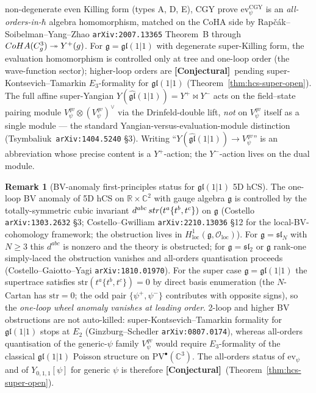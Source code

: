 \documentclass[11pt]{amsart}
\theoremstyle{definition}
\newtheorem{remark}[theorem]{Remark}
\providecommand{\CoHA}{\mathrm{CoHA}}
\providecommand{\cO}{\mathcal{O}}
\providecommand{\R}{\mathbb{R}}
\providecommand{\C}{\mathbb{C}}
\providecommand{\fgl}{\mathfrak{gl}}
\providecommand{\fsl}{\mathfrak{sl}}
\providecommand{\fg}{\mathfrak{g}}
\providecommand{\ClaimStatusConjectured}{\textbf{\textsf{[Conjectural]}}}
\begin{document}
non-degenerate even Killing form (types A, D, E), CGY prove
$\mathrm{ev}^{\mathrm{CGY}}_\psi$ is an \emph{all-orders-in-$\hbar$}
algebra homomorphism, matched on the CoHA side by
Rap\v{c}\'ak--Soibelman--Yang--Zhao \texttt{arXiv:2007.13365} Theorem~B
through $\CoHA(\C^3_\fg) \twoheadrightarrow Y^+(\widehat\fg)$. For
$\fg = \fgl(1|1)$ with degenerate super-Killing form, the evaluation
homomorphism is controlled only at tree and one-loop order (the
wave-function sector); higher-loop orders are \ClaimStatusConjectured\
pending super-Kontsevich--Tamarkin $E_3$-formality for $\fgl(1|1)$
(Theorem~\ref{thm:hcs-super-open}). The full affine super-Yangian
$Y(\widehat{\fgl}(1|1)) = Y^+ \bowtie Y^-$ acts on the field--state
pairing module $V^{qv}_\psi \otimes (V^{qv}_\psi)^\vee$ via the
Drinfeld-double lift, \emph{not} on $V^{qv}_\psi$ itself as a single
module --- the standard Yangian-versus-evaluation-module distinction
(Tsymbaliuk~\texttt{arXiv:1404.5240} §3). Writing
``$Y(\widehat{\fgl}(1|1)) \to V^{qv}_\psi$'' is an abbreviation whose
precise content is a $Y^+$-action; the $Y^-$-action lives on the dual
module.

\begin{remark}[BV-anomaly first-principles status for $\fgl(1|1)$ 5D hCS]
\label{rem:bv-anomaly-super-firstprinciples}
The one-loop BV anomaly of 5D hCS on $\R\times\C^2$ with gauge algebra
$\fg$ is controlled by the totally-symmetric cubic invariant
$d^{abc}\,{\rm str}(t^a\{t^b,t^c\})$ on $\fg$ (Costello
\texttt{arXiv:1303.2632} \S3; Costello--Gwilliam \texttt{arXiv:2210.13036}
\S12 for the local-BV-cohomology framework; the obstruction lives in
$H^1_{\mathrm{loc}}(\fg, \cO_{\mathrm{loc}})$). For $\fg = \fsl_N$ with
$N\geq 3$ this $d^{abc}$ is nonzero and the theory is obstructed; for
$\fg = \fsl_2$ or $\fg$ rank-one simply-laced the obstruction vanishes
and all-orders quantisation proceeds (Costello--Gaiotto--Yagi
\texttt{arXiv:1810.01970}). For the super case $\fg = \fgl(1|1)$ the
supertrace satisfies $\mathrm{str}(t^a\{t^b,t^c\}) = 0$ by direct basis
enumeration (the $N$-Cartan has $\mathrm{str} = 0$; the odd pair
$\{\psi^+,\psi^-\}$ contributes with opposite signs), so the
\emph{one-loop wheel anomaly vanishes at leading order}. 2-loop and
higher BV obstructions are not auto-killed: super-Kontsevich--Tamarkin
formality for $\fgl(1|1)$ stops at $E_2$ (Ginzburg--Schedler
\texttt{arXiv:0807.0174}), whereas all-orders quantisation of the
generic-$\psi$ family $V^{qv}_\psi$ would require $E_3$-formality of
the classical $\fgl(1|1)$ Poisson structure on $\mathrm{PV}^\bullet(\C^3)$.
The all-orders status of $\mathrm{ev}_\psi$ and of $Y_{0,1,1}[\psi]$ for
generic $\psi$ is therefore \ClaimStatusConjectured\
(Theorem~\ref{thm:hcs-super-open}).
\end{remark}
\end{document}
